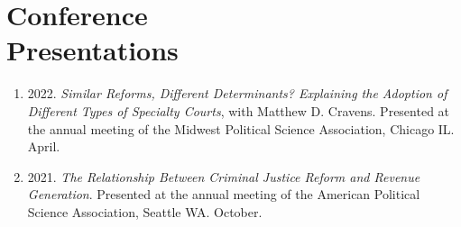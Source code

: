 \documentclass[margin,line,pifont,palatino,courier]{res}
\begin{document}
\begin{resume}
\begin{enumerate}
\end{enumerate}








\section{\sc Conference\\ Presentations}

\begin{enumerate}

\item 2022. \emph{Similar Reforms, Different Determinants? Explaining
    the Adoption of Different Types of Specialty Courts}, with Matthew
  D. Cravens. Presented at the annual meeting of the Midwest Political
  Science Association, Chicago IL. April.

\item 2021. \emph{The Relationship Between Criminal Justice Reform and
    Revenue Generation}. Presented at the annual meeting of the
  American Political Science Association, Seattle WA. October.


\end{enumerate}
\end{resume}
\end{document}
